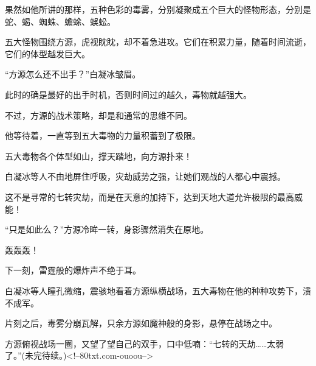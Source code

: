 \begin{this_body}
果然如他所讲的那样，五种色彩的毒雾，分别凝聚成五个巨大的怪物形态，分别是蛇、蝎、蜘蛛、蟾蜍、蜈蚣。

五大怪物围绕方源，虎视眈眈，却不着急进攻。它们在积累力量，随着时间流逝，它们的体型越发巨大。

“方源怎么还不出手？”白凝冰皱眉。

此时的确是最好的出手时机，否则时间过的越久，毒物就越强大。

不过，方源的战术策略，却是和通常的思维不同。

他等待着，一直等到五大毒物的力量积蓄到了极限。

五大毒物各个体型如山，撑天踏地，向方源扑来！

白凝冰等人不由地屏住呼吸，灾劫威势之强，让她们观战的人都心中震撼。

这不是寻常的七转灾劫，而是在天意的加持下，达到天地大道允许极限的最高威能！

“只是如此么？”方源冷眸一转，身影骤然消失在原地。

轰轰轰！

下一刻，雷霆般的爆炸声不绝于耳。

白凝冰等人瞳孔微缩，震骇地看着方源纵横战场，五大毒物在他的种种攻势下，溃不成军。

片刻之后，毒雾分崩瓦解，只余方源如魔神般的身影，悬停在战场之中。

方源俯视战场一圈，又望了望自己的双手，口中低喃：“七转的天劫……太弱了。”(未完待续。)<!--80txt.com-ouoou-->

\end{this_body}

